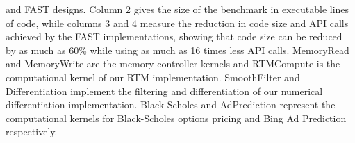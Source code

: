 \documentclass[a4paper, 11]{article}
\newcommand{\FAST}[0]{FAST}
\begin{document}
\begin{table}[!ht]
{{      and \FAST{} designs. Column 2 gives the size of the benchmark in
      executable lines of code, while columns 3 and 4 measure the
      reduction in code size and API calls achieved by the FAST
      implementations, showing that code size can be reduced by as
      much as 60\% while using as much as 16 times less API
      calls. MemoryRead and MemoryWrite are the memory controller
      kernels and RTMCompute is the computational kernel of our RTM
      implementation. SmoothFilter and Differentiation implement the
      filtering and differentiation of our numerical differentiation
      implementation. Black-Scholes and AdPrediction represent the
      computational kernels for Black-Scholes options pricing and Bing
      Ad Prediction respectively.}
  \label{table:benchmark}
}
\end{table}


\clearpage

\newcommand{\BIBdecl}{\setlength{\itemsep}{0.4 em}}



\end{document}

